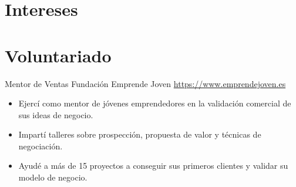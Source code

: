 \documentclass[a4paper, serif, 10pt]{moderncv}
\begin{document}
\section{Intereses}

\section{Voluntariado}

        {Mentor de Ventas}
        {Fundación Emprende Joven}
        {\url{https://www.emprendejoven.es}}
        {}
        {\begin{itemize}
\item Ejercí como mentor de jóvenes emprendedores en la validación comercial de sus ideas de negocio.
\item Impartí talleres sobre prospección, propuesta de valor y técnicas de negociación.
\item Ayudé a más de 15 proyectos a conseguir sus primeros clientes y validar su modelo de negocio.
\end{itemize}}
    
\end{document}

